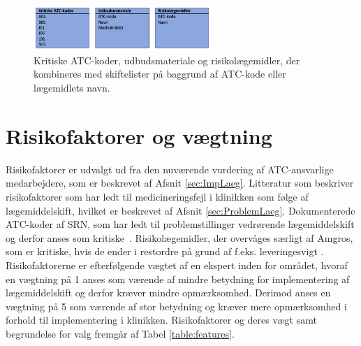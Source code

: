 \begin{figure}[H]\centering
\includegraphics[width=0.6\textwidth]{billeder/Input2.png} 
	\caption{Kritiske ATC-koder, udbudsmateriale og risikolægemidler, der kombineres med skiftelister på baggrund af ATC-kode eller lægemidlets navn.}
	\label{fig:Input2}  
\end{figure}

\section{Risikofaktorer og vægtning}
Risikofaktorer er udvalgt ud fra den nuværende vurdering af ATC-ansvarlige medarbejdere, som er beskrevet af Afsnit \ref{sec:ImpLaeg}. Litteratur som beskriver risikofaktorer som har ledt til medicineringsfejl i klinikken som følge af lægemiddelskift, hvilket er beskrevet af Afsnit \ref{sec:ProblemLaeg}. Dokumenterede ATC-koder af SRN, som har ledt til problemstillinger vedrørende lægemiddelskift og derfor anses som kritiske~\citep{SRN}. Risikolægemidler, der overvåges særligt af Amgros, som er kritiske, hvis de ender i restordre på grund af f.eks. leveringesvigt \citep{Amgros}. Risikofaktorerne er efterfølgende vægtet af en ekspert inden for området, hvoraf en vægtning på 1 anses som værende af mindre betydning for implementering af lægemiddelskift og derfor kræver mindre opmærksomhed. Derimod anses en vægtning på 5 som værende af stor betydning og kræver mere opmærksomhed i forhold til implementering i klinikken.
Risikofaktorer og deres vægt samt begrundelse for valg fremgår af Tabel \ref{table:features}.


